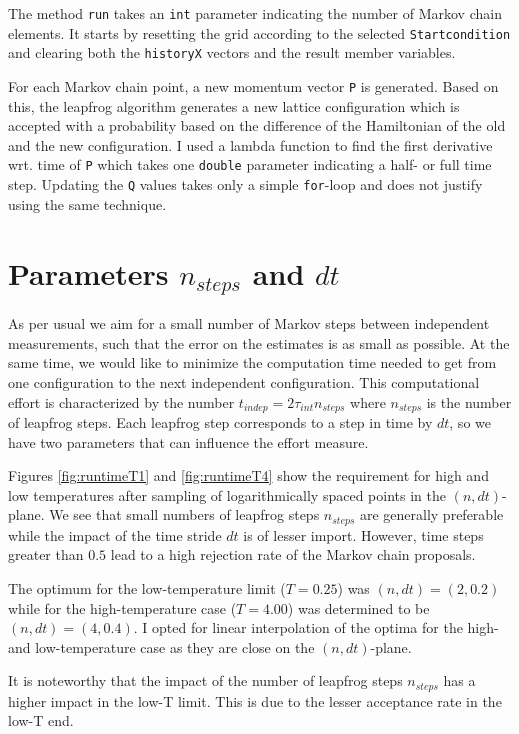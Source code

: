 The method \texttt{run} takes an \texttt{int} parameter indicating the number of Markov chain elements. It starts by resetting the grid according to the selected \texttt{Startcondition} and clearing both the \texttt{historyX} vectors and the result member variables.

For each Markov chain point, a new momentum vector \texttt{P} is generated. Based on this, the leapfrog algorithm generates a new lattice configuration which is accepted with a probability based on the difference of the Hamiltonian of the old and the new configuration. I used a lambda function to find the first derivative wrt. time of \texttt{P} which takes one \texttt{double} parameter indicating a half- or full time step. Updating the \texttt{Q} values takes only a simple \texttt{for}-loop and does not justify using the same technique.

\chapter{Parameters $n_{steps}$ and $dt$}
As per usual we aim for a small number of Markov steps between independent measurements, such that the error on the estimates is as small as possible. At the same time, we would like to minimize the computation time needed to get from one configuration to the next independent configuration. This computational effort is characterized by the number $t_{indep} = 2 \tau_{int} n_{steps}$ where $n_{steps}$ is the number of leapfrog steps. Each leapfrog step corresponds to a step in time by $dt$, so we have two parameters that can influence the effort measure.

Figures \ref{fig:runtimeT1} and \ref{fig:runtimeT4} show the requirement for high and low temperatures after sampling of logarithmically spaced points in the $(n, dt)$-plane. We see that small numbers of leapfrog steps $n_{steps}$ are generally preferable while the impact of the time stride $dt$ is of lesser import. However, time steps greater than $0.5$ lead to a high rejection rate of the Markov chain proposals.

The optimum for the low-temperature limit ($T=0.25$) was $(n, dt) = (2, 0.2)$ while for the high-temperature case ($T=4.00$) was determined to be $(n, dt) = (4, 0.4)$. I opted for linear interpolation of the optima for the high- and low-temperature case as they are close on the $(n, dt)$-plane.

It is noteworthy that the impact of the number of leapfrog steps $n_{steps}$ has a higher impact in the low-T limit. This is due to the lesser acceptance rate in the low-T end.

